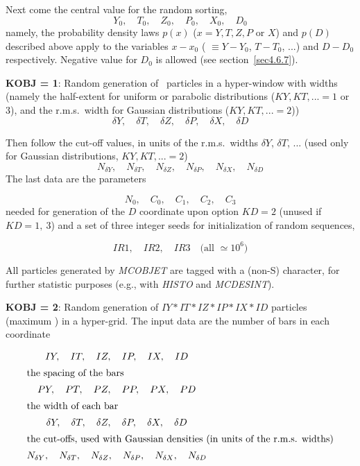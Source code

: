 \noindent Next come the central value for the random sorting, 
$$    Y_0,\quad    T_0,\quad    Z_0,\quad P_0,\quad  X_0, \quad D_0 $$
%
namely, the probability density laws $p(x)$ ($x= Y, T, Z, P$ or $X$) 
and $p(D)$ described above apply to the variables $x-x_0$
( $\equiv Y- Y_0$, $T-T_0$, ...) and $D- D_0$ respectively. Negative 
value for $D_0$ is allowed (see section~\ref{sec4.6.7}).
 \bigskip

\noindent\textbf{KOBJ  =  1}: Random  generation of \IMAX\ particles  
in a hyper-window with widths
(namely the half-extent for uniform or parabolic distributions ($KY, 
KT, ... =1$ or 3), and  the r.m.s.~width for Gaussian distributions ($KY, 
KT, ... =2$))
$$   \delta Y,\quad   \delta T,\quad   \delta Z,\quad   \delta P,\quad   \delta X,\quad  \delta D $$

\noindent Then follow the cut-off values, in units of the 
r.m.s.~widths $\delta Y$, $\delta T$, ... (used only for  Gaussian distributions,  
$KY, KT, ... =2$)
$$
	N_{\delta Y},\quad N_{\delta T},\quad N_{\delta Z},\quad N_{\delta P},\quad N_{\delta X},\quad N_{\delta D}
$$	 
\noindent The last data are the parameters 

$$ N_0,\quad C_0,\quad C_1,\quad C_2,\quad C_3 $$ 
%
 needed for generation of the $ D $ coordinate upon option
 $ KD  =  2$ (unused if $ KD = 1,~3$) and a set of three integer seeds for initialization of random sequences,
 
 $$ IR1,\quad   IR2, \quad  IR3 \quad \text{(all $\simeq 10^6 $)}$$
%

\medskip

\noindent All particles generated by \textsl{MCOBJET}  are tagged with
a (non-S) character, for further statistic purposes 
(e.g., with \textsl{HISTO} and \textsl{MCDESINT}).  
\medskip

\noindent\textbf{KOBJ  =  2}: Random  generation of 
$ IY \ast   IT  \ast IZ \ast  IP  \ast  IX  \ast  ID $ particles    
(maximum \imax) in a  hyper-grid.  The input data are the number of bars    in 
each coordinate

 \begin{gather*}
	 IY,\quad IT,\quad IZ,\quad IP,\quad IX, \quad ID \\
%
\intertext{the spacing of the bars} 
	PY,\quad PT,\quad PZ,\quad PP,\quad PX, \quad PD \\
%
\intertext{the width of each bar} 
	\delta Y,\quad \delta T,\quad \delta Z,\quad \delta P,\quad \delta X,\quad \delta D  \\
%
\intertext{the cut-offs, used with Gaussian densities (in units of the r.m.s. widths)}
	N_{\delta Y},\quad N_{\delta T},\quad N_{\delta Z},\quad N_{\delta P},\quad N_{\delta X},\quad N_{\delta D}
 \end{gather*}

